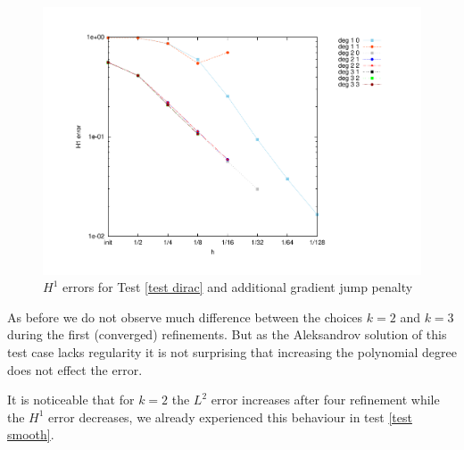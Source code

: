 \begin{figure}[H]
		\centering
		\includegraphics[scale =0.4]{plots/MA4_Neilan_GradJump_h1.pdf}
	\caption{$H^1$ errors for Test \ref{test dirac} and additional gradient jump penalty}
	\label{fig: h1 errors test 4 jump}
\end{figure}
As before we do not observe much difference between the choices $k=2$ and $k=3$ during the first (converged) refinements. But as the Aleksandrov solution of this test case lacks regularity it is not surprising that increasing the polynomial degree does not effect the error.

It is noticeable that for $k=2$ the $L^2$ error increases after four refinement while the $H^1$ error decreases, we already experienced this behaviour in test \ref{test smooth}.
